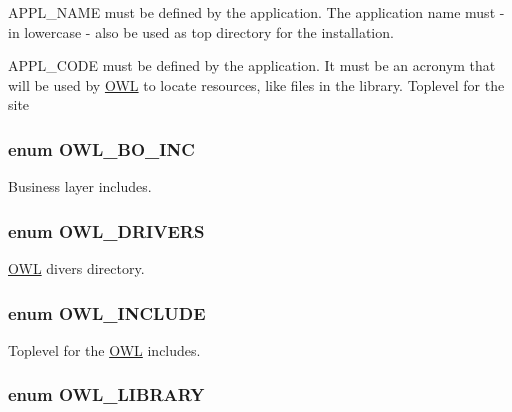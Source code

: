 APPL\_\-NAME must be defined by the application. The application name must -\/ in lowercase -\/ also be used as top directory for the installation. 

APPL\_\-CODE must be defined by the application. It must be an acronym that will be used by \hyperlink{classOWL}{OWL} to locate resources, like files in the library. Toplevel for the site 
\subsubsection[{OWL\_\-BO\_\-INC}]{\setlength{\rightskip}{0pt plus 5cm}enum {\bf OWL\_\-BO\_\-INC}}\label{OWLloader_8php_aca50646bc73c3addf0e0f25081eae0ae}


Business layer includes. 

\subsubsection[{OWL\_\-DRIVERS}]{\setlength{\rightskip}{0pt plus 5cm}enum {\bf OWL\_\-DRIVERS}}\label{OWLloader_8php_af6ffde4ef80c21c2e105c89dab9c011e}


\hyperlink{classOWL}{OWL} divers directory. 

\subsubsection[{OWL\_\-INCLUDE}]{\setlength{\rightskip}{0pt plus 5cm}enum {\bf OWL\_\-INCLUDE}}\label{OWLloader_8php_a4d33a8f2fcc9c83cbeea921c4cb23a7f}


Toplevel for the \hyperlink{classOWL}{OWL} includes. 

\subsubsection[{OWL\_\-LIBRARY}]{\setlength{\rightskip}{0pt plus 5cm}enum {\bf OWL\_\-LIBRARY}}\label{OWLloader_8php_a74eed08508c8b70677c4167acf49e427}


